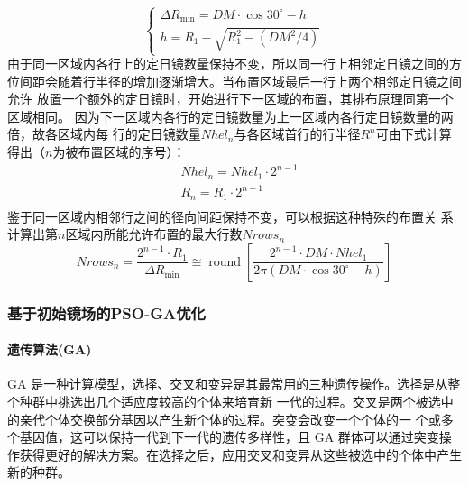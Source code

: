 \documentclass{article}
\numberwithin{equation}{subsection}
\begin{document}
\begin{equation}
    \left\{\begin{array}{l}
    \Delta R_{\min }=DM \cdot \cos 30^{\circ}-h \\
    h=R_1-\sqrt{R_1^2-\left({DM}^2 / 4\right)}
    \end{array}\right.
\end{equation}
\newpage
由于同一区域内各行上的定日镜数量保持不变，所以同一行上相邻定日镜之间的方
位间距会随着行半径的增加逐渐增大。当布置区域最后一行上两个相邻定日镜之间允许
放置一个额外的定日镜时，开始进行下一区域的布置，其排布原理同第一个区域相同。
因为下一区域内各行的定日镜数量为上一区域内各行定日镜数量的两倍，故各区域内每
行的定日镜数量$Nhel_n$与各区域首行的行半径$R_1^n$可由下式计算得出（$n$为被布置区域的序号）：
\begin{equation}
    \begin{aligned}
        &Nhel_n=Nhel_1 \cdot 2^{n-1}\\
        &R_n=R_1 \cdot 2^{n-1}\\
    \end{aligned}
\end{equation}
鉴于同一区域内相邻行之间的径向间距保持不变，可以根据这种特殊的布置关
系计算出第$n$区域内所能允许布置的最大行数$Nrows_n$
\begin{equation}
    {Nrows}_n=\frac{2^{n-1} \cdot R_1}{\Delta R_{\min }} \cong \operatorname{round}\left[\frac{2^{n-1} \cdot {DM} \cdot {Nhel}_1}{2 \pi\left({DM} \cdot \cos 30^{\circ}-h\right)}\right]
\end{equation}


\subsubsection{基于初始镜场的PSO-GA优化}

\paragraph{遗传算法(GA)}  
GA 是一种计算模型，选择、交叉和变异是其最常用的三种遗传操作。选择是从整个种群中挑选出几个适应度较高的个体来培育新
一代的过程。交叉是两个被选中的亲代个体交换部分基因以产生新个体的过程。突变会改变一个个体的一
个或多个基因值，这可以保持一代到下一代的遗传多样性，且 GA 群体可以通过突变操
作获得更好的解决方案。在选择之后，应用交叉和变异从这些被选中的个体中产生新的种群。
\end{document}
